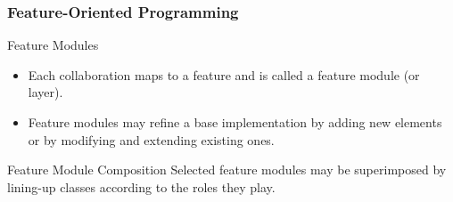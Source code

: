 \subsubsection*{Feature-Oriented Programming}

\begin{frame}{\myframetitle}
	\begin{mycolumns}[widths={65,35},animation=none]
		\begin{definition}{Feature Modules}
			\begin{itemize}
				\item Each collaboration maps to a feature and is called a feature module (or layer).
				\item Feature modules may refine a base implementation by adding new elements or by modifying and extending existing ones.
			\end{itemize}
		\end{definition}
	\mynextcolumn
		\begin{definition}{Feature Module Composition}
			Selected feature modules may be superimposed by lining-up classes according to the roles they play.
		\end{definition}
	\end{mycolumns}
	\begin{exampletight}{}
		\centering
	\end{exampletight}
\end{frame}

